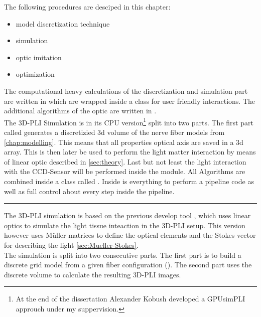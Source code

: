 % 
The following procedures are desciped in this chapter:
\begin{itemize}[nosep]
    \item model discretization technique
    \item simulation
    \item optic imitation
    \item optimization
\end{itemize}
% 
The computational heavy calculations of the discretization and simulation part are written in \cpp{} which are wrapped inside a \python class  for user friendly interactions.
The additional algorithms of the optic are written in .
% 
\\[\baselineskip]
% 
% 
The \ac{3D-PLI} Simulation is in its \ac{CPU} version\footnote{At the end of the dissertation Alexander Kobush developed a GPUsimPLI approuch under my suppervision.} split into two parts.
The first part called  \tikzset{external/export next=false}  generates a discretizied 3d volume of the nerve fiber models from \cref{chap:modelling}.
This means that all properties \eg{} optical axis are saved in a 3d array.
This  is then later be used to perform the light matter interaction by means of linear optic described in \cref{sec:theory}.
Last but not least the light interaction with the \ac{CCD}-Sensor will be performed inside the  module.
All Algorithms are combined inside a \python{} class called .
Inside is everything to perform a pipeline code as well as full control about every step inside the pipeline.
% 
% 
% 
\vspace{5pt}
\hrule
\vspace{6pt}
\newpage
% 
The \ac{3D-PLI} simulation is based on the previous develop tool \simpli \cite{Dohmen2015}, which uses linear optics \cite{} to simulate the light tissue inteaction in the \ac{3D-PLI} setup.
This version however uses M\"uller matrices \cite{} to define the optical elements and the Stokes vector \cite{} for describing the light \cref{sec:Mueller-Stokes}.\\
% 
The simulation is split into two consecutive parts.
The first part is to build a discrete grid model from a given fiber configuration (\eg \dummy{}).
The second part uses the discrete volume to calculate the resulting \ac{3D-PLI} images.
%
%
%
